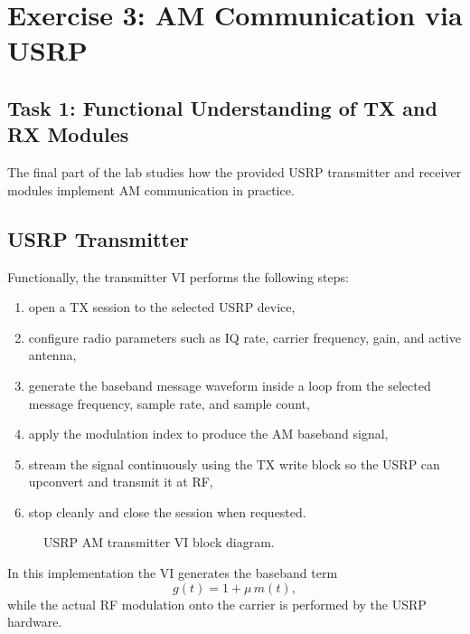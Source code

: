 \section{Exercise 3: AM Communication via USRP}
\label{sec:lab2_ex3}

\subsection{Task 1: Functional Understanding of TX and RX Modules}

The final part of the lab studies how the provided USRP transmitter and receiver
modules implement AM communication in practice.

\subsection{USRP Transmitter}

Functionally, the transmitter VI performs the following steps:
\begin{enumerate}
\item open a TX session to the selected USRP device,
\item configure radio parameters such as IQ rate, carrier frequency, gain, and
active antenna,
\item generate the baseband message waveform inside a loop from the selected
message frequency, sample rate, and sample count,
\item apply the modulation index to produce the AM baseband signal,
\item stream the signal continuously using the TX write block so the USRP can
upconvert and transmit it at RF,
\item stop cleanly and close the session when requested.
\end{enumerate}

\begin{figure}[H]
\centering
{}
\caption{USRP AM transmitter VI block diagram.}
\label{fig:lab2_usrp_tx_vi}
\end{figure}

In this implementation the VI generates the baseband term
\begin{equation}
g(t)=1+\mu\,m(t),
\end{equation}
while the actual RF modulation onto the carrier is performed by the USRP
hardware.

